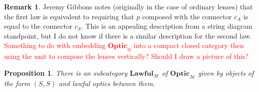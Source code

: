\documentclass[11pt,a4paper]{article}
\theoremstyle{plain}
\newtheorem{proposition}[theorem]{Proposition}
\theoremstyle{definition}
\newtheorem{remark}[theorem]{Remark}
\newcommand{\M}{\mathscr{M}}
\newcommand{\Optic}{\mathbf{Optic}}
\newcommand{\Lawful}{\mathbf{Lawful}}
\newcommand{\todo}[1]{\textcolor{red}{\small #1}}
\begin{document}
\begin{remark}
  Jeremy Gibbons notes (originally in the case of ordinary lenses) that the first law is equivalent to requiring that $p$ composed with the connector $c_A$ is equal to the connector $c_S$. This is an appealing description from a string diagram standpoint, but I do not know if there is a similar description for the second law. \todo{Something to do with embedding $\Optic_\otimes$ into a compact closed category then using the unit to compose the lenses vertically? Should I draw a picture of this?}
\end{remark}

\begin{proposition}
  There is an subcategory $\Lawful_\M$ of $\Optic_\M$ given by objects of the form $(S, S)$ and lawful optics between them.
\end{proposition}
\end{document}
